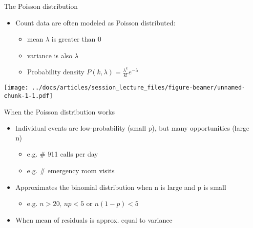 \documentclass[ignorenonframetext,]{beamer}
\providecommand{\tightlist}{%
  \setlength{\itemsep}{0pt}\setlength{\parskip}{0pt}}
\begin{document}
\begin{frame}{The Poisson distribution}
\protect\hypertarget{the-poisson-distribution}{}

\begin{itemize}
\tightlist
\item
  Count data are often modeled as Poisson distributed:

  \begin{itemize}
  \tightlist
  \item
    mean \(\lambda\) is greater than 0
  \item
    variance is also \(\lambda\)
  \item
    Probability density
    \(P(k, \lambda) = \frac{\lambda^k}{k!} e^{-\lambda}\)
  \end{itemize}
\end{itemize}

\texttt{[image: ../docs/articles/session\_lecture\_files/figure-beamer/unnamed-chunk-1-1.pdf]}

\end{frame}

\begin{frame}{When the Poisson distribution works}
\protect\hypertarget{when-the-poisson-distribution-works}{}

\begin{itemize}
\tightlist
\item
  Individual events are low-probability (small p), but many
  opportunities (large n)

  \begin{itemize}
  \tightlist
  \item
    e.g. \# 911 calls per day
  \item
    e.g. \# emergency room visits
  \end{itemize}
\item
  Approximates the binomial distribution when n is large and p is small

  \begin{itemize}
  \tightlist
  \item
    e.g. \(n > 20\), \(np < 5\) or \(n(1-p) < 5\)
  \end{itemize}
\item
  When mean of residuals is approx. equal to variance
\end{itemize}

\end{frame}
\end{document}
